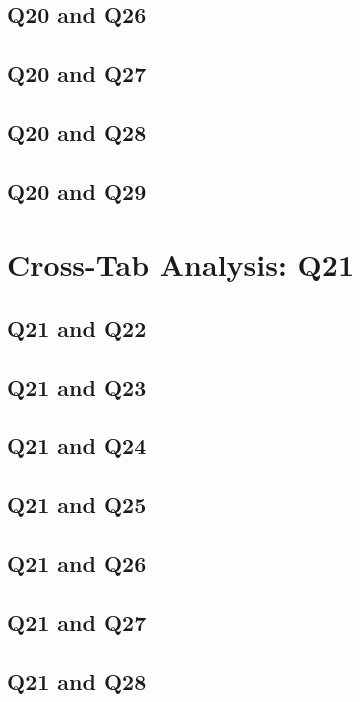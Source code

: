 \documentclass{report}
\begin{document}
\section{Q20 and Q26}\clearpage
\section{Q20 and Q27}\clearpage
\section{Q20 and Q28}\clearpage
\section{Q20 and Q29}\clearpage

\chapter{Cross-Tab Analysis: Q21}

\section{Q21 and Q22}\clearpage
\section{Q21 and Q23}\clearpage
\section{Q21 and Q24}\clearpage
\section{Q21 and Q25}\clearpage
\section{Q21 and Q26}\clearpage
\section{Q21 and Q27}\clearpage
\section{Q21 and Q28}\clearpage
\end{document}
